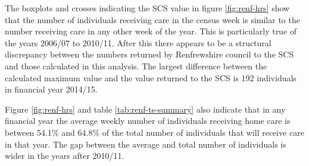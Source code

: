 \documentclass[]{article}
\begin{document}
The boxplots and crosses indicating the SCS value in figure
\ref{fig:renf-hrs} show that the number of individuals receiving care in
the census week is similar to the number receiving care in any other
week of the year. This is particularly true of the years 2006/07 to
2010/11. After this there appears to be a structural discrepancy between
the numbers returned by Renfrewshire council to the SCS and those
calculated in this analysis. The largest difference between the
calculated maximum value and the value returned to the SCS is 192
individuals in financial year 2014/15.

Figure \ref{fig:renf-hrs} and table \ref{tab:renf-ts-summary} also
indicate that in any financial year the average weekly number of
individuals receiving home care is between 54.1\% and 64.8\% of the
total number of individuals that will receive care in that year. The gap
between the average and total number of individuals is wider in the
years after 2010/11.

\begin{table}[h]
\centering
\caption{Variation in the number of individuals receiving home care}
\label{tab:renf-ts-summary}
\end{table}
\end{document}
